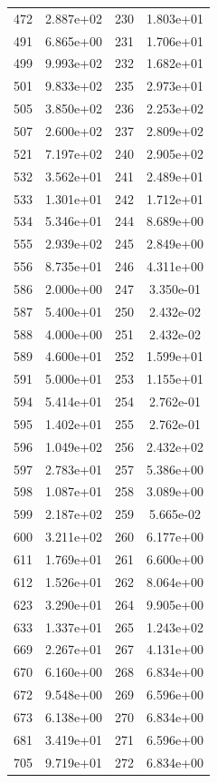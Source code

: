 \documentclass[12pt]{article}
\begin{document}
\begin{longtable}{@{}cccc@{}}
472 & 2.887e+02 & 230 & 1.803e+01 \\
491 & 6.865e+00 & 231 & 1.706e+01 \\
499 & 9.993e+02 & 232 & 1.682e+01 \\
501 & 9.833e+02 & 235 & 2.973e+01 \\
505 & 3.850e+02 & 236 & 2.253e+02 \\
507 & 2.600e+02 & 237 & 2.809e+02 \\
521 & 7.197e+02 & 240 & 2.905e+02 \\
532 & 3.562e+01 & 241 & 2.489e+01 \\
533 & 1.301e+01 & 242 & 1.712e+01 \\
534 & 5.346e+01 & 244 & 8.689e+00 \\
555 & 2.939e+02 & 245 & 2.849e+00 \\
556 & 8.735e+01 & 246 & 4.311e+00 \\
586 & 2.000e+00 & 247 & 3.350e-01 \\
587 & 5.400e+01 & 250 & 2.432e-02 \\
588 & 4.000e+00 & 251 & 2.432e-02 \\
589 & 4.600e+01 & 252 & 1.599e+01 \\
591 & 5.000e+01 & 253 & 1.155e+01 \\
594 & 5.414e+01 & 254 & 2.762e-01 \\
595 & 1.402e+01 & 255 & 2.762e-01 \\
596 & 1.049e+02 & 256 & 2.432e+02 \\
597 & 2.783e+01 & 257 & 5.386e+00 \\
598 & 1.087e+01 & 258 & 3.089e+00 \\
599 & 2.187e+02 & 259 & 5.665e-02 \\
600 & 3.211e+02 & 260 & 6.177e+00 \\
611 & 1.769e+01 & 261 & 6.600e+00 \\
612 & 1.526e+01 & 262 & 8.064e+00 \\
623 & 3.290e+01 & 264 & 9.905e+00 \\
633 & 1.337e+01 & 265 & 1.243e+02 \\
669 & 2.267e+01 & 267 & 4.131e+00 \\
670 & 6.160e+00 & 268 & 6.834e+00 \\
672 & 9.548e+00 & 269 & 6.596e+00 \\
673 & 6.138e+00 & 270 & 6.834e+00 \\
681 & 3.419e+01 & 271 & 6.596e+00 \\
705 & 9.719e+01 & 272 & 6.834e+00 \\

\end{longtable}
\end{document}
